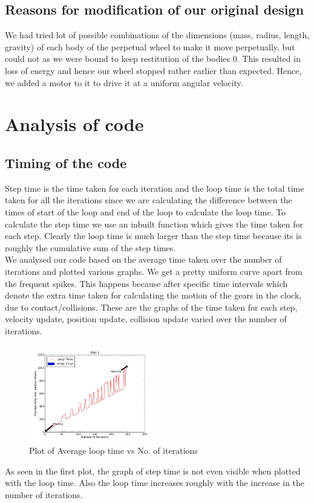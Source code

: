 \documentclass[10pt]{article} \usepackage[a4paper,left=0.8in,right=0.8in,top=0.4in,bottom=0.8in]{geometry} \usepackage{graphicx}
\begin{document}
\subsection{Reasons for modification of our original design}
We had tried lot of possible combinations of the dimensions (mass, radius, length, gravity) of each body of the perpetual wheel to make it move perpetually, but could not as we were bound to keep restitution of the bodies 0. This resulted in loss of energy and hence our wheel stopped rather earlier than expected. Hence, we added a motor to it to drive it at a uniform angular velocity.

\section{Analysis of code}
\subsection{Timing of the code}
Step time is the time taken for each iteration and the loop time is the total time taken for all the iterations since we are calculating the difference between the times of start of the loop and end of the loop to calculate the loop time. To calculate the step time we use an inbuilt function which gives the time taken for each step. Clearly the loop time is much larger than the step time because its is roughly the cumulative sum of the step times.\\
We analysed our code based on the average time taken over the number of iterations and plotted various graphs. We get a pretty uniform curve apart from the frequent spikes. This happens because after specific time intervals which denote the extra time taken for calculating the motion of the gears in the clock, due to contact/collisions. These are the graphs of the time taken for each step, velocity update, position update, collision update varied over the number of iterations.

\begin{figure}[ht!]
\centering
\includegraphics[width=0.5\textwidth]{images/plot1.jpg}
\caption{Plot of Average loop time vs No. of iterations}
\end{figure}
As seen in the first plot, the graph of step time is not even visible when plotted with the loop time. Also the loop time increases roughly with the increase in the number of iterations.
\end{document}
